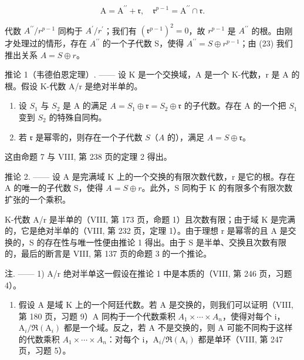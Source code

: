 \[
\mathrm{A} = \mathrm{A} ^ {\prime \prime} + \mathfrak {r}, \quad \mathfrak {r} ^ {p - 1} = \mathrm{A} ^ {\prime \prime} \cap \mathfrak {r}.\tag{23}
\]

代数 \(A^{\prime\prime}/r^{p-1}\) 同构于 \(A^{\prime}/r^{\prime}\)；我们有 \((\mathfrak{r}^{p-1})^{2}=0\)，故 \(r^{p-1}\) 是 \(A^{\prime\prime}\) 的根。由刚才处理过的情形，存在 \(A^{\prime\prime}\) 的一个子代数 S，使得 \(A^{\prime\prime}=S\oplus r^{p-1}\)；由 (23) 我们推出关系 \(A=S\oplus r\)。

推论 1（韦德伯恩定理）. —— 设 K 是一个交换域，A 是一个 K-代数，r 是 A 的根。假设 K-代数 A/r 是绝对半单的。

\begin{enumerate}
\def\labelenumi{\alph{enumi})}
\item
  设 \(S_1\) 与 \(S_2\) 是 A 的满足 \(A = S_1 \oplus \mathfrak{r} = S_2 \oplus \mathfrak{r}\) 的子代数。存在 A 的一个把 \(S_1\) 变到 \(S_2\) 的特殊自同构。
\item
  若 \(\mathfrak{r}\) 是幂零的，则存在一个子代数 \(S\)（\(A\) 的），满足 \(A = S \oplus \mathfrak{r}\)。
\end{enumerate}

这由命题 7 与 VIII, 第 238 页的定理 2 得出。

推论 2. —— 设 A 是完满域 K 上的一个交换的有限次数代数，r 是它的根。存在 A 的唯一的子代数 S，使得 \(A = S \oplus r\)。此外，S 同构于 K 的有限多个有限次数扩张的一个乘积。

K-代数 A/r 是半单的（VIII, 第 173 页，命题 1）且次数有限；由于域 K 是完满的，它是绝对半单的（VIII, 第 232 页，定理 1）。由于理想 r 是幂零的且 A 是交换的，S 的存在性与唯一性便由推论 1 得出。由于 S 是半单、交换且次数有限的，最后的断言是 VIII, 第 137 页的命题 3 的一个推论。

注. —— 1) A/r 绝对半单这一假设在推论 1 中是本质的（VIII, 第 246 页，习题 4）。

\begin{enumerate}
\def\labelenumi{\arabic{enumi})}
\setcounter{enumi}{1}
\tightlist
\item
  假设 A 是域 K 上的一个阿廷代数。若 A 是交换的，则我们可以证明（VIII, 第 180 页，习题 9）A 同构于一个代数乘积 \(A_{1} \times \cdots \times A_{n}\)，使得对每个 i，\(\mathrm{A}_{i}/\Re(\mathrm{A}_{i})\) 都是一个域。反之，若 A 不是交换的，则 A 可能不同构于这样的代数乘积 \(A_{1} \times \cdots \times A_{n}\)：对每个 i，\(\mathrm{A}_{i}/\Re(\mathrm{A}_{i})\) 都是单环（VIII, 第 247 页，习题 5）。
\end{enumerate}

